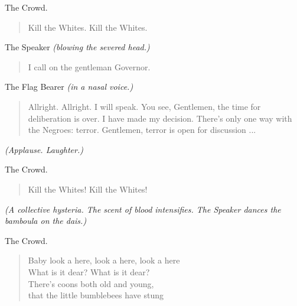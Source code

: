 \documentclass[letterpaper,article,12pt,oneside,notitlepage]{memoir}
\begin{document}
\begin{center}The Crowd.\end{center}

\begin{verse}
\hspace{1cm} Kill the Whites. Kill the Whites. \\
\end{verse}

\begin{center}The Speaker \textit{(blowing the severed head.)}\end{center}

\begin{verse}
\hspace{1cm} I call on the gentleman Governor. \\
\end{verse}

\begin{center}The Flag Bearer \textit{(in a nasal voice.)}\end{center}

\begin{verse}
\indent Allright. Allright. I will speak. You see, Gentlemen, the time for deliberation is over. I have made my decision. There's only one way with the Negroes: terror. Gentlemen, terror is open for discussion ... \\
\end{verse}

\textit{(Applause. Laughter.)}

\begin{center}The Crowd.\end{center}

\begin{verse}
\hspace{1cm} Kill the Whites! Kill the Whites! \\
\end{verse}

\textit{(A collective hysteria. The scent of blood intensifies. The Speaker dances the bamboula on the dais.)}

\begin{center}The Crowd.\end{center}

\begin{verse}
\hspace{1cm} Baby look a here, look a here, look a here \\
\hspace{1cm} What is it dear? What is it dear? \\
\hspace{1cm} There's coons both old and young, \\
\hspace{1cm} that the little bumblebees have stung \\
\end{verse}
\end{document}
